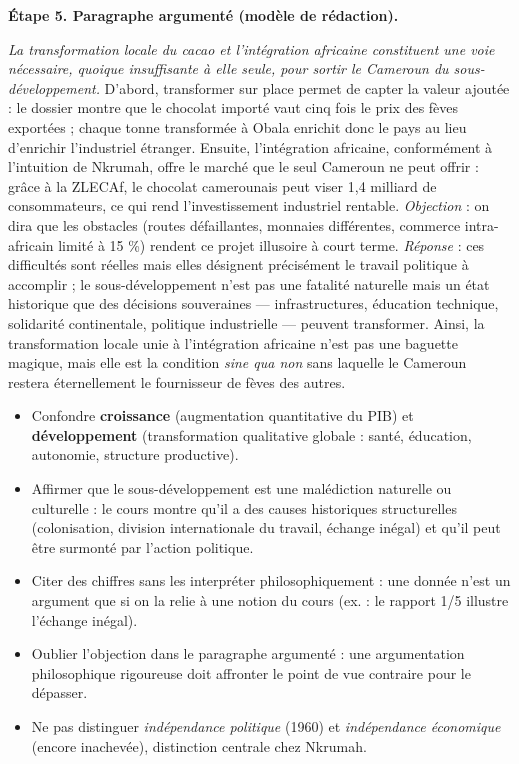 \documentclass[11pt]{article}
\begin{document}
\begin{exoresolu}
\textbf{Étape 5. Paragraphe argumenté (modèle de rédaction).}

\emph{La transformation locale du cacao et l'intégration africaine constituent une voie nécessaire, quoique insuffisante à elle seule, pour sortir le Cameroun du sous-développement.} D'abord, transformer sur place permet de capter la valeur ajoutée : le dossier montre que le chocolat importé vaut cinq fois le prix des fèves exportées ; chaque tonne transformée à Obala enrichit donc le pays au lieu d'enrichir l'industriel étranger. Ensuite, l'intégration africaine, conformément à l'intuition de Nkrumah, offre le marché que le seul Cameroun ne peut offrir : grâce à la ZLECAf, le chocolat camerounais peut viser 1,4 milliard de consommateurs, ce qui rend l'investissement industriel rentable. \emph{Objection} : on dira que les obstacles (routes défaillantes, monnaies différentes, commerce intra-africain limité à 15 \%) rendent ce projet illusoire à court terme. \emph{Réponse} : ces difficultés sont réelles mais elles désignent précisément le travail politique à accomplir ; le sous-développement n'est pas une fatalité naturelle mais un état historique que des décisions souveraines — infrastructures, éducation technique, solidarité continentale, politique industrielle — peuvent transformer. Ainsi, la transformation locale unie à l'intégration africaine n'est pas une baguette magique, mais elle est la condition \emph{sine qua non} sans laquelle le Cameroun restera éternellement le fournisseur de fèves des autres.
\end{exoresolu}

\begin{attention}
\begin{itemize}
\item Confondre \textbf{croissance} (augmentation quantitative du PIB) et \textbf{développement} (transformation qualitative globale : santé, éducation, autonomie, structure productive).
\item Affirmer que le sous-développement est une \og malédiction \fg{} naturelle ou culturelle : le cours montre qu'il a des causes historiques structurelles (colonisation, division internationale du travail, échange inégal) et qu'il peut être surmonté par l'action politique.
\item Citer des chiffres sans les interpréter philosophiquement : une donnée n'est un argument que si on la relie à une notion du cours (ex. : le rapport 1/5 illustre l'échange inégal).
\item Oublier l'objection dans le paragraphe argumenté : une argumentation philosophique rigoureuse doit affronter le point de vue contraire pour le dépasser.
\item Ne pas distinguer \emph{indépendance politique} (1960) et \emph{indépendance économique} (encore inachevée), distinction centrale chez Nkrumah.
\end{itemize}
\end{attention}
\end{document}

